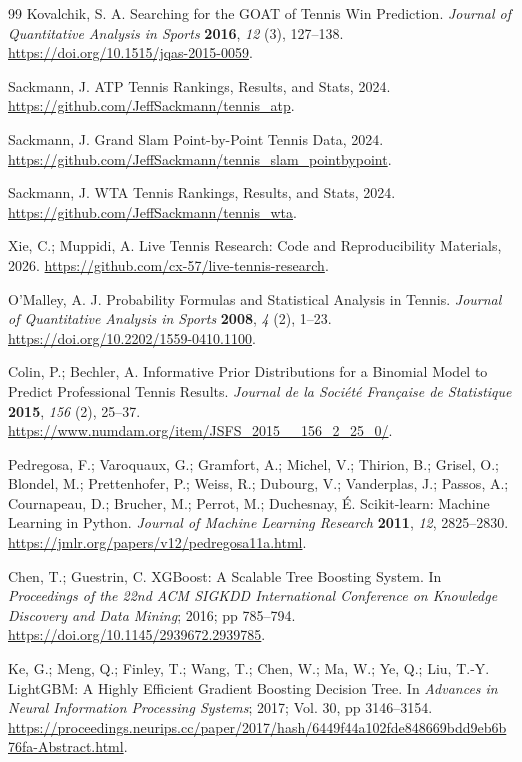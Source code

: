 \documentclass[10pt,twocolumn]{article}
\begin{document}
\begin{thebibliography}{99}
Kovalchik, S. A. Searching for the GOAT of Tennis Win Prediction. \emph{Journal of Quantitative Analysis in Sports} \textbf{2016}, \emph{12} (3), 127--138. \url{https://doi.org/10.1515/jqas-2015-0059}.

Sackmann, J. ATP Tennis Rankings, Results, and Stats, 2024. \url{https://github.com/JeffSackmann/tennis_atp}.

Sackmann, J. Grand Slam Point-by-Point Tennis Data, 2024. \url{https://github.com/JeffSackmann/tennis_slam_pointbypoint}.

Sackmann, J. WTA Tennis Rankings, Results, and Stats, 2024. \url{https://github.com/JeffSackmann/tennis_wta}.

Xie, C.; Muppidi, A. Live Tennis Research: Code and Reproducibility Materials, 2026. \url{https://github.com/cx-57/live-tennis-research}.

O'Malley, A. J. Probability Formulas and Statistical Analysis in Tennis. \emph{Journal of Quantitative Analysis in Sports} \textbf{2008}, \emph{4} (2), 1--23. \url{https://doi.org/10.2202/1559-0410.1100}.

Colin, P.; Bechler, A. Informative Prior Distributions for a Binomial Model to Predict Professional Tennis Results. \emph{Journal de la Société Française de Statistique} \textbf{2015}, \emph{156} (2), 25--37. \url{https://www.numdam.org/item/JSFS_2015__156_2_25_0/}.

Pedregosa, F.; Varoquaux, G.; Gramfort, A.; Michel, V.; Thirion, B.; Grisel, O.; Blondel, M.; Prettenhofer, P.; Weiss, R.; Dubourg, V.; Vanderplas, J.; Passos, A.; Cournapeau, D.; Brucher, M.; Perrot, M.; Duchesnay, É. Scikit-learn: Machine Learning in Python. \emph{Journal of Machine Learning Research} \textbf{2011}, \emph{12}, 2825--2830. \url{https://jmlr.org/papers/v12/pedregosa11a.html}.

Chen, T.; Guestrin, C. XGBoost: A Scalable Tree Boosting System. In \emph{Proceedings of the 22nd ACM SIGKDD International Conference on Knowledge Discovery and Data Mining}; 2016; pp 785--794. \url{https://doi.org/10.1145/2939672.2939785}.

Ke, G.; Meng, Q.; Finley, T.; Wang, T.; Chen, W.; Ma, W.; Ye, Q.; Liu, T.-Y. LightGBM: A Highly Efficient Gradient Boosting Decision Tree. In \emph{Advances in Neural Information Processing Systems}; 2017; Vol. 30, pp 3146--3154. \url{https://proceedings.neurips.cc/paper/2017/hash/6449f44a102fde848669bdd9eb6b76fa-Abstract.html}.


\end{thebibliography}
\end{document}
